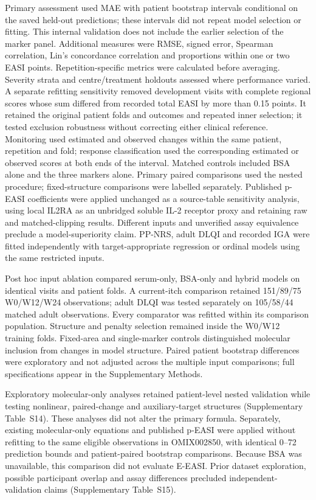 \documentclass[10pt,a4paper]{article}
\begin{document}
Primary assessment used MAE with patient bootstrap intervals conditional on the saved held-out predictions; these intervals did not repeat model selection or fitting. This internal validation does not include the earlier selection of the marker panel. Additional measures were RMSE, signed error, Spearman correlation, Lin's concordance correlation and proportions within one or two EASI points. Repetition-specific metrics were calculated before averaging. Severity strata and centre/treatment holdouts assessed where performance varied. A separate refitting sensitivity removed development visits with complete regional scores whose sum differed from recorded total EASI by more than 0.15 points. It retained the original patient folds and outcomes and repeated inner selection; it tested exclusion robustness without correcting either clinical reference. Monitoring used estimated and observed changes within the same patient, repetition and fold; response classification used the corresponding estimated or observed scores at both ends of the interval. Matched controls included BSA alone and the three markers alone. Primary paired comparisons used the nested procedure; fixed-structure comparisons were labelled separately. Published p-EASI coefficients were applied unchanged as a source-table sensitivity analysis, using local IL2RA as an unbridged soluble IL-2 receptor proxy and retaining raw and matched-clipping results. Different inputs and unverified assay equivalence preclude a model-superiority claim.\citep{thijs2017,thijs2019,bakker2020} PP-NRS, adult DLQI and recorded IGA were fitted independently with target-appropriate regression or ordinal models using the same restricted inputs.

Post hoc input ablation compared serum-only, BSA-only and hybrid models on identical visits and patient folds. A current-itch comparison retained 151/89/75 W0/W12/W24 observations; adult DLQI was tested separately on 105/58/44 matched adult observations. Every comparator was refitted within its comparison population. Structure and penalty selection remained inside the W0/W12 training folds. Fixed-area and single-marker controls distinguished molecular inclusion from changes in model structure. Paired patient bootstrap differences were exploratory and not adjusted across the multiple input comparisons; full specifications appear in the Supplementary Methods.

Exploratory molecular-only analyses retained patient-level nested validation while testing nonlinear, paired-change and auxiliary-target structures (Supplementary Table~S14). These analyses did not alter the primary formula. Separately, existing molecular-only equations and published p-EASI were applied without refitting to the same eligible observations in OMIX002850, with identical 0--72 prediction bounds and patient-paired bootstrap comparisons. Because BSA was unavailable, this comparison did not evaluate E-EASI. Prior dataset exploration, possible participant overlap and assay differences precluded independent-validation claims (Supplementary Table~S15).
\end{document}
